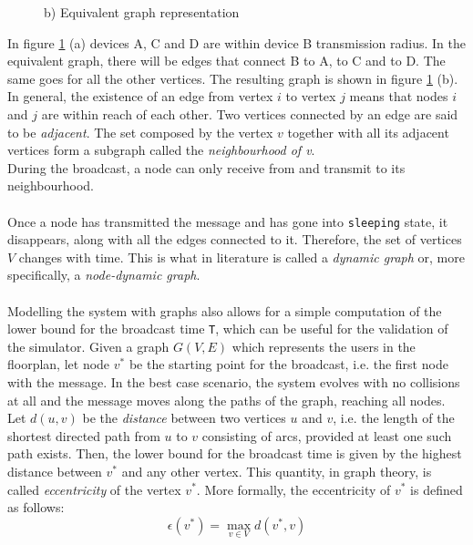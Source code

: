\begin{figure}[H]
\begin{minipage}{.5\textwidth}
		\begin{center}
            b) Equivalent graph representation
        \end{center}
	\end{minipage}
	\caption{}
    \label{fig:graph1}
\end{figure}
\noindent In figure \ref{fig:graph1} (a) devices A, C and D are within device B
transmission radius. In the equivalent graph, there will be edges that connect
B to A, to C and to D. The same goes for all the other vertices. The resulting
graph is shown in figure \ref{fig:graph1} (b).\\
In general, the existence of an edge from vertex $i$ to vertex $j$ means that
nodes $i$ and $j$ are within reach of each other. Two vertices connected by an
edge are said to be \textit{adjacent}. The set composed by the vertex $v$
together with all its adjacent vertices form a subgraph called the
\textit{neighbourhood of v}.\\
During the broadcast, a node can only receive from and transmit to its
neighbourhood.\\
\\
Once a node has transmitted the message and has gone into \texttt{sleeping}
state, it disappears, along with all the edges connected to it. Therefore, the
set of vertices $V$ changes with time. This is what in literature is called a
\textit{dynamic graph} or, more specifically, a
\textit{node-dynamic graph}\cite{harrygraph}.\\
\\
Modelling the system with graphs also allows for a simple computation of the
lower bound for the broadcast time \texttt{T}, which can be useful for the
validation of the simulator. Given a graph $G(V, E)$ which represents the users
in the floorplan, let node $v^{*}$ be the starting point for the broadcast, i.e.
the first node with the message. In the best case scenario, the system evolves
with no collisions at all and the message moves along the paths of the graph,
reaching all nodes. Let $d(u, v)$ be the \textit{distance} between two vertices
$u$ and $v$, i.e. the length of the shortest directed path from $u$ to $v$
consisting of arcs, provided at least one such path exists. Then, the lower
bound for the broadcast time is given by the highest distance between $v^{*}$
and any other vertex. This quantity, in graph theory, is called
\textit{eccentricity} of the vertex $v^{*}$. More formally, the eccentricity of
$v^{*}$ is defined as follows:
\begin{equation}
\epsilon(v^{*}) = \max_{v{\in}V} d(v^{*}, v)
\end{equation}
